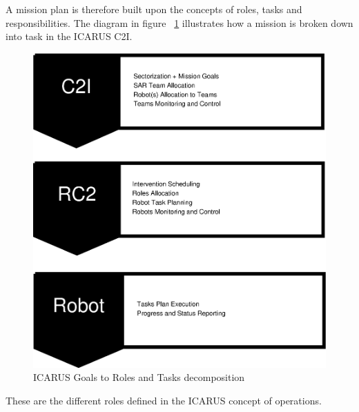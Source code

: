 \documentclass{article}
\begin{document}
A mission plan is therefore built upon the concepts of roles, tasks and responsibilities. The diagram in figure ~\ref{fig:goals_decomposition} illustrates how a mission is broken down into task in the ICARUS C2I.
\begin{figure} [h]
    \centering
    \includegraphics[trim=0cm 0cm 0cm 0cm,scale=0.5]{ROB-15-0035_fig3.eps}
    \caption{ICARUS Goals to Roles and Tasks decomposition}
    \label{fig:goals_decomposition}
\end{figure}
These are the different roles defined in the ICARUS concept of operations.
\end{document}
